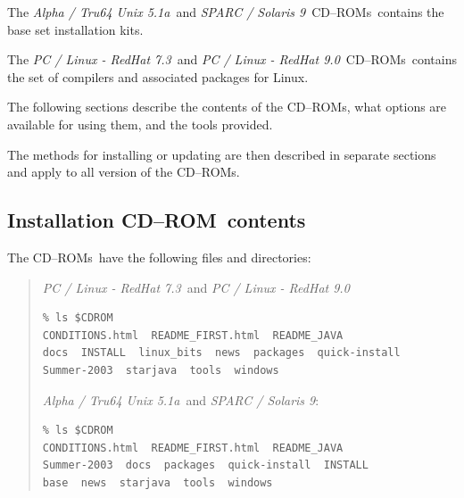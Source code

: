 \documentclass[twoside,11pt]{article}
\newcommand{\xlabel}[1]{}
\renewcommand{\_}{\texttt{\symbol{95}}}
\newcommand{\cdrom}{CD--ROM}
\newcommand{\cdrom}{CD-ROM}
\newcommand{\cdroms}{CD--ROMs}
\newcommand{\cdroms}{CD-ROMs}
\newcommand{\axp}{\textit{Alpha / Tru64 Unix 5.1a}}
\newcommand{\rha}{\textit{PC / Linux - RedHat 7.3}}
\newcommand{\rhb}{\textit{PC / Linux - RedHat 9.0}}
\newcommand{\sol}{\textit{SPARC / Solaris 9}}
\begin{document}
The \axp\ and \sol\ \cdroms\ contains the base set installation kits.

The \rha\ and \rhb\ \cdroms\ contains the set of compilers and associated
packages for Linux.  

The following sections describe the contents of the \cdroms, what
options are available for using them, and the tools provided.

The methods for installing or updating are then described in separate 
sections and apply to all version of the \cdroms.

\subsection{\xlabel{installation_cdrom_contents}Installation \cdrom\ contents}
\label{installation_cdrom_contents}

The \cdroms\ have the following files and directories:

\begin{quote}
\rha\ and \rhb
\begin{verbatim}
% ls $CDROM
CONDITIONS.html  README_FIRST.html  README_JAVA 
docs  INSTALL  linux_bits  news  packages  quick-install  
Summer-2003  starjava  tools  windows
\end{verbatim}
\axp\ and \sol:
\begin{verbatim}
% ls $CDROM
CONDITIONS.html  README_FIRST.html  README_JAVA 
Summer-2003  docs  packages  quick-install  INSTALL  
base  news  starjava  tools  windows
\end{verbatim}
\end{quote}
\end{document}
